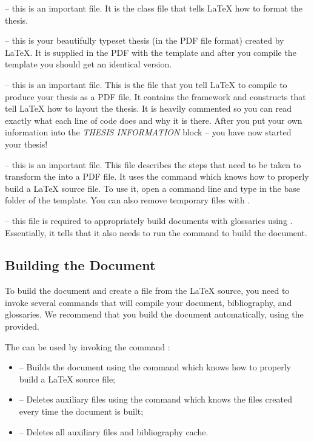  -- this is an important file. It is the class file that tells \LaTeX{} how to format the thesis. 

 -- this is your beautifully typeset thesis (in the PDF file format) created by \LaTeX{}. It is supplied in the PDF with the template and after you compile the template you should get an identical version.

 -- this is an important file. This is the file that you tell \LaTeX{} to compile to produce your thesis as a PDF file. It contains the framework and constructs that tell \LaTeX{} how to layout the thesis. It is heavily commented so you can read exactly what each line of code does and why it is there. After you put your own information into the \emph{THESIS INFORMATION} block -- you have now started your thesis!

 -- this is an important file. This file describes the steps that need to be taken to transform the  into a PDF file. It uses the command  which knows how to properly build a \LaTeX{} source file. To use it, open a command line and type  in the base folder of the template. You can also remove temporary files with . 

 -- this file is required to appropriately build documents with glossaries using . Essentially, it tells  that it also needs to run the command   to build the document.

\subsection{Building the Document}

To build the document and create a  file from the \LaTeX{} source, you need to invoke several commands that will compile your document, bibliography, and glossaries. We recommend that you build the document automatically, using the  provided.

The  can be used by invoking the command :
\begin{itemize}
\item {} -- Builds the document using the command  which knows how to properly build a \LaTeX{} source file;
\item {} -- Deletes auxiliary files using the command  which knows the files created every time the document is built;
\item {} -- Deletes all auxiliary files and bibliography cache.
\end{itemize}

